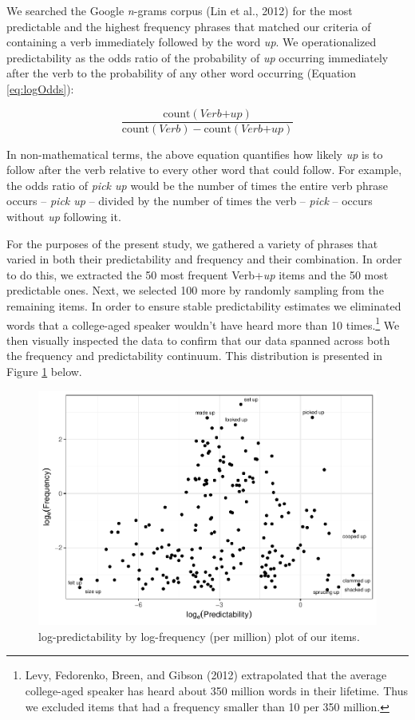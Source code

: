\documentclass[
  man,floatsintext]{apa6}
\begin{document}
We searched the Google \emph{n}-grams corpus (Lin et al., 2012) for the most predictable and the highest frequency phrases that matched our criteria of containing a verb immediately followed by the word \emph{up}. We operationalized predictability as the odds ratio of the probability of \emph{up} occurring immediately after the verb to the probability of any other word occurring (Equation \eqref{eq:logOdds}):

\begin{equation}
\label{eq:logOdds}
\frac{\mathrm{count(\textit{Verb+up})}}{\mathrm{count(\textit{Verb})} - \mathrm{count(\textit{Verb+up})}} 
\end{equation}

In non-mathematical terms, the above equation quantifies how likely \emph{up} is to follow after the verb relative to every other word that could follow. For example, the odds ratio of \emph{pick up} would be the number of times the entire verb phrase occurs -- \emph{pick up} -- divided by the number of times the verb -- \emph{pick} -- occurs without \emph{up} following it.

For the purposes of the present study, we gathered a variety of phrases that varied in both their predictability and frequency and their combination. In order to do this, we extracted the 50 most frequent Verb+\emph{up} items and the 50 most predictable ones. Next, we selected 100 more by randomly sampling from the remaining items. In order to ensure stable predictability estimates we eliminated words that a college-aged speaker wouldn't have heard more than 10 times.\footnote{Levy, Fedorenko, Breen, and Gibson (2012) extrapolated that the average college-aged speaker has heard about 350 million words in their lifetime. Thus we excluded items that had a frequency smaller than 10 per 350 million.} We then visually inspected the data to confirm that our data spanned across both the frequency and predictability continuum. This distribution is presented in Figure \ref{fig:stimplot2} below.

\begin{figure}

{\centering \includegraphics[width=0.8\linewidth]{write-up_files/figure-latex/stimplot2-1} 

}

\caption{log-predictability by log-frequency (per million) plot of our items.}\label{fig:stimplot2}
\end{figure}
\end{document}
